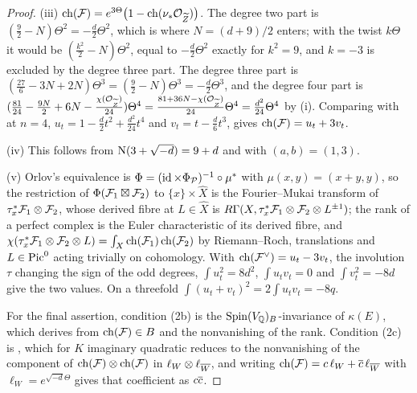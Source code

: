 \begin{proof}
(iii) $\operatorname{ch}(\mathcal{F})=e^{3\Theta}\bigl(1-\operatorname{ch}(\nu_{*}\mathcal{O}_{\widetilde Z})\bigr)$. The
degree two part is $(\tfrac92-N)\Theta^{2}=-\tfrac d2\Theta^{2}$, which is
where $N=(d+9)/2$ enters; with the twist $k\Theta$ it would be
$(\tfrac{k^{2}}{2}-N)\Theta^{2}$, equal to $-\tfrac d2\Theta^{2}$ exactly for
$k^{2}=9$, and $k=-3$ is excluded by the degree three part. The degree three
part is $(\tfrac{27}{6}-3N+2N)\Theta^{3}=(\tfrac92-N)\Theta^{3}=-\tfrac d2\Theta^{3}$,
and the degree four part is
$(\tfrac{81}{24}-\tfrac{9N}{2}+6N-\tfrac{\chi(\mathcal{O}_{\widetilde Z})}{24})\Theta^{4}
=\tfrac{81+36N-\chi(\mathcal{O}_{\widetilde Z})}{24}\Theta^{4}=\tfrac{d^{2}}{24}\Theta^{4}$
by (i). Comparing with \cite[(30)]{paperI} at $n=4$,
$u_{t}=1-\tfrac d2t^{2}+\tfrac{d^{2}}{24}t^{4}$ and $v_{t}=t-\tfrac d6t^{3}$,
gives $\operatorname{ch}(\mathcal{F})=u_{t}+3v_{t}$.

(iv) This follows from $\mathrm{N}(3+\sqrt{-d})=9+d$ and \cite[(31)]{paperI} with
$(a,b)=(1,3)$.

(v) Orlov's equivalence is $\Phi=(\operatorname{id}\times\Phi_{\mathcal{P}})^{-1}\circ\mu^{*}$ with
$\mu(x,y)=(x+y,y)$, so the restriction of $\Phi(\mathcal{F}_{1}\boxtimes\mathcal{F}_{2})$ to
$\{x\}\times\widehat X$ is the Fourier--Mukai transform of
$\tau_{x}^{*}\mathcal{F}_{1}\otimes\mathcal{F}_{2}$, whose derived fibre at $L\in\widehat X$
is $R\Gamma(X,\tau_{x}^{*}\mathcal{F}_{1}\otimes\mathcal{F}_{2}\otimes L^{\pm1})$; the rank
of a perfect complex is the Euler characteristic of its derived fibre, and
$\chi(\tau_{x}^{*}\mathcal{F}_{1}\otimes\mathcal{F}_{2}\otimes L)=\int_{X}\operatorname{ch}(\mathcal{F}_{1})\operatorname{ch}(\mathcal{F}_{2})$
by Riemann--Roch, translations and $L\in\operatorname{Pic}^{0}$ acting trivially on
cohomology. With $\operatorname{ch}(\mathcal{F}^{\vee})=u_{t}-3v_{t}$, the involution $\tau$
changing the sign of the odd degrees, $\int u_{t}^{2}=8d^{2}$,
$\int u_{t}v_{t}=0$ and $\int v_{t}^{2}=-8d$ give the two values. On a
threefold $\int(u_{t}+v_{t})^{2}=2\int u_{t}v_{t}=-8q$.

For the final assertion, condition (2b) is the
$\mathrm{Spin}(V_{\mathbb{Q}})_{B}$-invariance of $\kappa(E)$, which
\cite[Corollary 9.2]{Mar25b} derives from $\operatorname{ch}(\mathcal{F})\in B$ and the
nonvanishing of the rank. Condition (2c) is
\cite[Proposition 10.2]{Mar25b}, which for $K$ imaginary quadratic reduces
to the nonvanishing of the component of $\operatorname{ch}(\mathcal{F})\otimes\operatorname{ch}(\mathcal{F})$ in
$\ell_{W}\otimes\ell_{\overline{W}}$, and writing $\operatorname{ch}(\mathcal{F})=c\,\ell_{W}+\overline{c}\,\ell_{\overline{W}}$
with $\ell_{W}=e^{\sqrt{-d}\Theta}$ gives that coefficient as $c\overline{c}$.
\end{proof}

